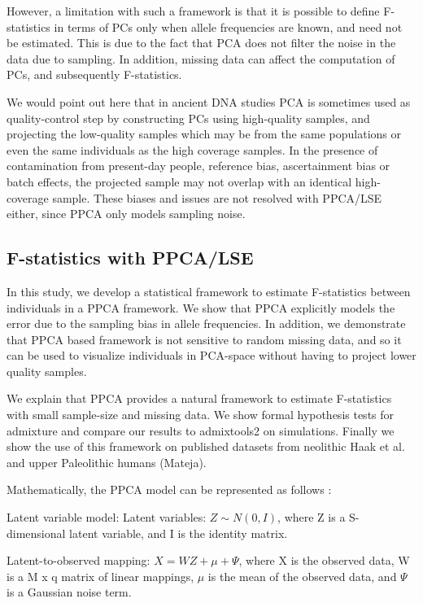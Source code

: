 \documentclass[12pt, letterpaper]{article}
\begin{document}
However, a limitation with such a framework is that it is possible to define F-statistics in terms of PCs only when allele frequencies are known, and need not be estimated. This is due to the fact that PCA does not filter the noise in the data due to sampling. In addition, missing data can affect the computation of PCs, and subsequently F-statistics.


We would point out here that in ancient DNA studies PCA is sometimes used as quality-control step by constructing PCs using high-quality samples, and projecting the low-quality samples which may be from the same populations or even the same individuals as the high coverage samples. In the presence of contamination from present-day people, reference bias, ascertainment bias or batch effects, the projected sample may not overlap with an identical high-coverage sample. These biases and issues are not resolved with PPCA/LSE either, since PPCA only models sampling noise. 


\subsection{F-statistics with PPCA/LSE}
In this study, we develop a statistical framework to estimate F-statistics between individuals in a PPCA framework. We show that PPCA explicitly models the error due to the sampling bias in allele frequencies. In addition, we demonstrate that PPCA based framework is not sensitive to random missing data, and so it can be used to visualize individuals in PCA-space without having to project lower quality samples.

We explain that PPCA provides a natural framework to estimate F-statistics with small sample-size and missing data. We show formal hypothesis tests for admixture and compare our results to admixtools2 \cite{maier_limits_2022} on simulations. Finally we show the use of this framework on published datasets from neolithic Haak et al. and upper Paleolithic humans (Mateja). 

Mathematically, the PPCA model can be represented as follows \cite{tipping_probabilistic_nodate}:

Latent variable model:
Latent variables: $Z \sim N(0, I)$, where Z is a S-dimensional latent variable, and I is the identity matrix.

Latent-to-observed mapping: $X = WZ + \mu + \Psi$, where X is the observed data, W is a M x q matrix of linear mappings, $\mu$ is the mean of the observed data, and $\Psi$ is a Gaussian noise term.
\end{document}
